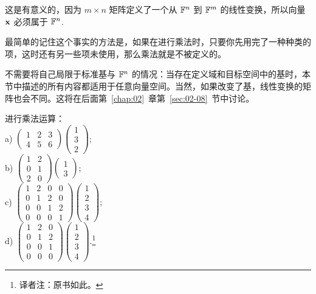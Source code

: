这是有意义的，因为 $m \times n$ 矩阵定义了一个从 $\mathbb{F}^n$ 到 $\mathbb{F}^m$ 的线性变换，所以向量 $\mathbf{x}$ 必须属于 $\mathbb{F}^n$.~

最简单的记住这个事实的方法是，如果在进行乘法时，只要你先用完了一种种类的项，这时还有另一些项未使用，那么乘法就是不被定义的。

\begin{remark*}
不需要将自己局限于标准基与 $\mathbb{F}^n$ 的情况：当存在定义域和目标空间中的基时，本节中描述的所有内容都适用于任意向量空间。当然，如果改变了基，线性变换的矩阵也会不同。这将在后面第~\ref{chap:02}~章第~\ref{sec:02-08}~节中讨论。
\end{remark*}


\begin{problemset}
\item \label{ex:01-03-01} 进行乘法运算：
\\
a) $\begin{pmatrix} 1 & 2 & 3 \\ 4 & 5 & 6 \end{pmatrix} \begin{pmatrix} 1 \\ 3 \\ 2 \end{pmatrix}$;
\\
b) $\begin{pmatrix} 1 & 2 \\ 0 & 1 \\ 2 & 0 \end{pmatrix} \begin{pmatrix} 1 \\ 3 \end{pmatrix}$;
\\
c) $\begin{pmatrix} 1 & 2 & 0 & 0 \\ 0 & 1 & 2 & 0 \\ 0 & 0 & 1 & 2 \\ 0 & 0 & 0 & 1 \end{pmatrix} \begin{pmatrix} 1 \\ 2 \\ 3 \\ 4 \end{pmatrix}$;
\\
d) $\begin{pmatrix} 1 & 2 & 0 \\ 0 & 1 & 2 \\ 0 & 0 & 1 \\ 0 & 0 & 0 \end{pmatrix} \begin{pmatrix} 1 \\ 2 \\ 3 \\ 4 \end{pmatrix}$.\footnote{译者注：原书如此。}

\end{problemset}
